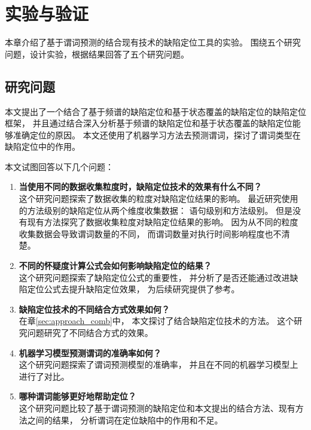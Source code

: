 \chapter{实验与验证}

本章介绍了基于谓词预测的结合现有技术的缺陷定位工具的实验。
围绕五个研究问题，设计实验，根据结果回答了五个研究问题。

\section{研究问题}

本文提出了一个结合了基于频谱的缺陷定位和基于状态覆盖的缺陷定位的缺陷定位框架，
并且通过结合深入分析基于频谱的缺陷定位和基于状态覆盖的缺陷定位能够准确定位的原因。
本文还使用了机器学习方法去预测谓词，探讨了谓词类型在缺陷定位中的作用。

本文试图回答以下几个问题：
\begin{enumerate}
\item \textbf{当使用不同的数据收集粒度时，缺陷定位技术的效果有什么不同？} \\
这个研究问题探索了数据收集的粒度对缺陷定位结果的影响。
最近研究使用的方法级别的缺陷定位从两个维度收集数据：
语句级别和方法级别。
但是没有现有方法探究了数据收集粒度对缺陷定位结果的影响。
因为从不同的粒度收集数据会导致谓词数量的不同，
而谓词数量对执行时间影响程度也不清楚。
\item \textbf{不同的怀疑度计算公式会如何影响缺陷定位的结果？} \\
这个研究问题探索了缺陷定位公式的重要性，
并分析了是否还能通过改进缺陷定位公式去提升缺陷定位效果，
为后续研究提供了参考。
\item \textbf{缺陷定位技术的不同结合方式效果如何？} \\
在章\ref{sec:approach_comb}中，
本文探讨了结合缺陷定位技术的方法。
这个研究问题研究了不同结合方式的效果。
\item \textbf{机器学习模型预测谓词的准确率如何？} \\
这个研究问题探索了谓词预测模型的准确率，
并且在不同的机器学习模型上进行了对比。
\item \textbf{哪种谓词能够更好地帮助定位？} \\
这个研究问题比较了基于谓词预测的缺陷定位和本文提出的结合方法、现有方法之间的结果，
分析谓词在定位缺陷中的作用和不足。

\end{enumerate}

